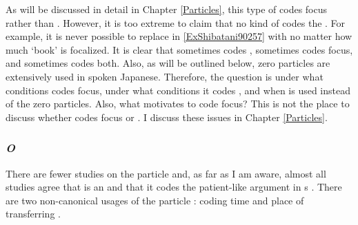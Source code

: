 As will be discussed in detail in Chapter \ref{Particles},
this type of  codes focus rather than .
However, it is too extreme to claim that no kind of  codes the .
For example, it is never possible to replace
 in \ref{ExShibatani90257} with 
no matter how much  `book' is focalized.
It is clear that  sometimes codes , sometimes codes focus, and sometimes codes both.
Also, as will be outlined below,
zero particles are extensively used in spoken Japanese.
Therefore, the question is under what conditions  codes focus,
under what conditions it codes ,
and when is  used instead of the zero particles.
Also, what motivates  to code focus?
This is not the place to discuss whether  codes focus or .
I discuss these issues in Chapter \ref{Particles}.



\subsubsection{\textit{O}}

There are fewer studies on the particle  and,
as far as I am aware, almost all studies agree that  is an 
and that it codes the patient-like argument in s \cite[e.g.,][]{yamada36,shibatani90}.
There are two non-canonical usages of the particle : coding time and place of transferring \cite{yamada36}.



